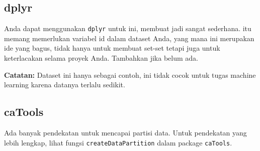 \documentclass[
]{book}
\newenvironment{Shaded}{\begin{snugshade}}{\end{snugshade}}
\newcommand{\CommentTok}[1]{\textcolor[rgb]{0.56,0.35,0.01}{\textit{#1}}}
\newcommand{\DataTypeTok}[1]{\textcolor[rgb]{0.13,0.29,0.53}{#1}}
\newcommand{\DecValTok}[1]{\textcolor[rgb]{0.00,0.00,0.81}{#1}}
\newcommand{\KeywordTok}[1]{\textcolor[rgb]{0.13,0.29,0.53}{\textbf{#1}}}
\newcommand{\NormalTok}[1]{#1}
\newcommand{\OperatorTok}[1]{\textcolor[rgb]{0.81,0.36,0.00}{\textbf{#1}}}
\newcommand{\StringTok}[1]{\textcolor[rgb]{0.31,0.60,0.02}{#1}}
\begin{document}
\hypertarget{dplyr}{%
\subsection{dplyr}\label{dplyr}}

Anda dapat menggunakan \texttt{dplyr} untuk ini, membuat jadi sangat sederhana. itu memang memerlukan variabel id dalam dataset Anda, yang mana ini merupakan ide yang bagus, tidak hanya untuk membuat set-set tetapi juga untuk keterlacakan selama proyek Anda. Tambahkan jika belum ada.

\begin{Shaded}
\end{Shaded}

\textbf{Catatan:} Dataset ini hanya sebagai contoh, ini tidak cocok untuk tugas machine learning karena datanya terlalu sedikit.

\hypertarget{catools}{%
\subsection{caTools}\label{catools}}

Ada banyak pendekatan untuk mencapai partisi data. Untuk pendekatan yang lebih lengkap, lihat fungsi \texttt{createDataPartition} dalam package \texttt{caTools}.
\end{document}
